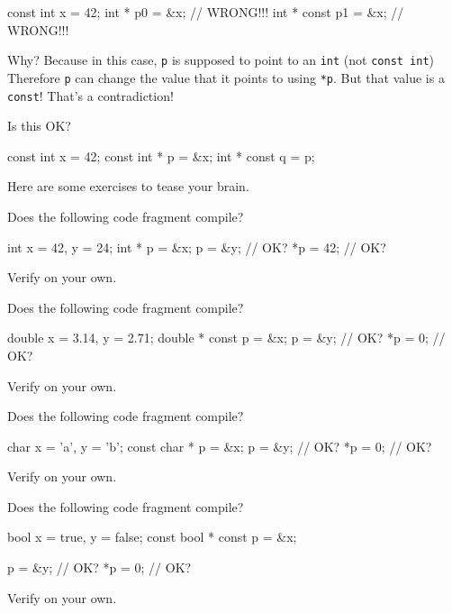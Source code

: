 \begin{consolethree}[escapeinside=||]
const int x = 42;
int * p0 = &x;       // WRONG!!!
int * const p1 = &x; // WRONG!!! 
\end{consolethree}

Why? Because in this case, \texttt{p} is supposed to point to an \texttt{int} (not \texttt{const int}) Therefore \texttt{p} can change the value that it points to using \texttt{*p}. But that value is a \texttt{const}! That's a contradiction!

\begin{ex}
Is this OK?

\begin{consolethree}[escapeinside=||]
const int x = 42;
const int * p = &x;
int * const q = p;
\end{consolethree}
Here are some exercises to tease your brain.
\end{ex}

\begin{ex}
Does the following code fragment compile?

\begin{consolethree}[escapeinside=||]
int x = 42, y = 24;
int * p = &x;
p = &y;     // OK?
*p = 42;    // OK?
\end{consolethree}
Verify on your own.
\end{ex}

\begin{ex}
Does the following code fragment compile?

\begin{consolethree}[escapeinside=||]
double x = 3.14, y = 2.71;
double * const p = &x;
p = &y; // OK?
*p = 0; // OK?
\end{consolethree}
Verify on your own.
\end{ex}

\begin{ex}
Does the following code fragment compile?

\begin{consolethree}[escapeinside=||]
char x = 'a', y = 'b';
const char * p = &x;
p = &y;      // OK?
*p = 0;      // OK?
\end{consolethree}
Verify on your own.
\end{ex}

\begin{ex}
Does the following code fragment compile?

\begin{consolethree}[escapeinside=||]
bool x = true, y = false;
const bool * const p = &x;

p = &y;      // OK?
*p = 0;      // OK?
\end{consolethree}
Verify on your own.
\end{ex}

